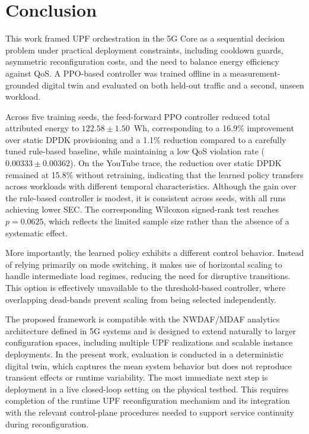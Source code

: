 \documentclass[a4paper,fleqn]{cas-sc}
\begin{document}
\section{Conclusion}
\label{conclusion}

This work framed UPF orchestration in the 5G Core as a sequential decision problem under practical deployment constraints, including cooldown guards, asymmetric reconfiguration costs, and the need to balance energy efficiency against QoS. A PPO-based controller was trained offline in a measurement-grounded digital twin and evaluated on both held-out traffic and a second, unseen workload.

Across five training seeds, the feed-forward PPO controller reduced total attributed energy to $122.58 \pm 1.50$~Wh, corresponding to a 16.9\% improvement over static DPDK provisioning and a 1.1\% reduction compared to a carefully tuned rule-based baseline, while maintaining a low QoS violation rate ($0.00333 \pm 0.00362$). On the YouTube trace, the reduction over static DPDK remained at 15.8\% without retraining, indicating that the learned policy transfers across workloads with different temporal characteristics. Although the gain over the rule-based controller is modest, it is consistent across seeds, with all runs achieving lower SEC. The corresponding Wilcoxon signed-rank test reaches $p=0.0625$, which reflects the limited sample size rather than the absence of a systematic effect.

More importantly, the learned policy exhibits a different control behavior. Instead of relying primarily on mode switching, it makes use of horizontal scaling to handle intermediate load regimes, reducing the need for disruptive transitions. This option is effectively unavailable to the threshold-based controller, where overlapping dead-bands prevent scaling from being selected independently.

The proposed framework is compatible with the NWDAF/MDAF analytics architecture defined in 5G systems and is designed to extend naturally to larger configuration spaces, including multiple UPF realizations and scalable instance deployments. In the present work, evaluation is conducted in a deterministic digital twin, which captures the mean system behavior but does not reproduce transient effects or runtime variability. The most immediate next step is deployment in a live closed-loop setting on the physical testbed. This requires completion of the runtime UPF reconfiguration mechanism and its integration with the relevant control-plane procedures needed to support service continuity during reconfiguration.
\end{document}
